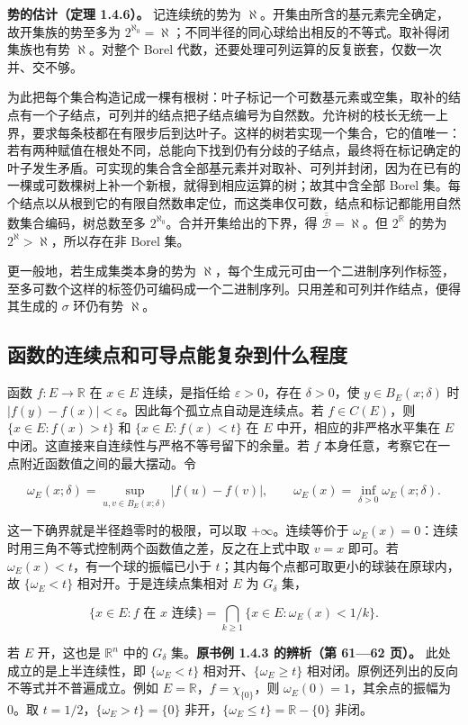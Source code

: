 \documentclass[11pt,a4paper]{article}
\begin{document}
\textbf{势的估计（定理 1.4.6）。} 记连续统的势为 \(\aleph\)。开集由所含的基元素完全确定，故开集族的势至多为 \(2^{\aleph_0}=\aleph\)；不同半径的同心球给出相反的不等式。取补得闭集族也有势 \(\aleph\)。对整个 Borel 代数，还要处理可列运算的反复嵌套，仅数一次并、交不够。

为此把每个集合构造记成一棵有根树：叶子标记一个可数基元素或空集，取补的结点有一个子结点，可列并的结点把子结点编号为自然数。允许树的枝长无统一上界，要求每条枝都在有限步后到达叶子。这样的树若实现一个集合，它的值唯一：若有两种赋值在根处不同，总能向下找到仍有分歧的子结点，最终将在标记确定的叶子发生矛盾。可实现的集合含全部基元素并对取补、可列并封闭，因为在已有的一棵或可数棵树上补一个新根，就得到相应运算的树；故其中含全部 Borel 集。每个结点以从根到它的有限自然数串定位，而这类串仅可数，结点和标记都能用自然数集合编码，树总数至多 \(2^{\aleph_0}\)。合并开集给出的下界，得 \(\overline{\overline{\mathcal B}}=\aleph\)。但 \(2^{\mathbb R}\) 的势为 \(2^{\aleph}>\aleph\)，所以存在非 Borel 集。

更一般地，若生成集类本身的势为 \(\aleph\)，每个生成元可由一个二进制序列作标签，至多可数个这样的标签仍可编码成一个二进制序列。只用差和可列并作结点，便得其生成的 \(\sigma\) 环仍有势 \(\aleph\)。

\subsection{函数的连续点和可导点能复杂到什么程度}

函数 \(f:E\to\mathbb R\) 在 \(x\in E\) 连续，是指任给 \(\varepsilon>0\)，存在 \(\delta>0\)，使 \(y\in B_E(x;\delta)\) 时 \(|f(y)-f(x)|<\varepsilon\)。因此每个孤立点自动是连续点。若 \(f\in C(E)\)，则 \(\{x\in E:f(x)>t\}\) 和 \(\{x\in E:f(x)<t\}\) 在 \(E\) 中开，相应的非严格水平集在 \(E\) 中闭。这直接来自连续性与严格不等号留下的余量。若 \(f\) 本身任意，考察它在一点附近函数值之间的最大摆动。令

\[
\omega_E(x;\delta)=\sup_{u,v\in B_E(x;\delta)}|f(u)-f(v)|,
\qquad \omega_E(x)=\inf_{\delta>0}\omega_E(x;\delta).
\]

这一下确界就是半径趋零时的极限，可以取 \(+\infty\)。连续等价于 \(\omega_E(x)=0\)：连续时用三角不等式控制两个函数值之差，反之在上式中取 \(v=x\) 即可。若 \(\omega_E(x)<t\)，有一个球的振幅已小于 \(t\)；其内每个点都可取更小的球装在原球内，故 \(\{\omega_E<t\}\) 相对开。于是连续点集相对 \(E\) 为 \(G_\delta\) 集，

\[
\{x\in E:f\text{ 在 }x\text{ 连续}\}
=\bigcap_{k\ge1}\{x\in E:\omega_E(x)<1/k\}.
\]

若 \(E\) 开，这也是 \(\mathbb R^n\) 中的 \(G_\delta\) 集。\textbf{原书例 1.4.3 的辨析（第 61---62 页）。} 此处成立的是上半连续性，即 \(\{\omega_E<t\}\) 相对开、\(\{\omega_E\ge t\}\) 相对闭。原例还列出的反向不等式并不普遍成立。例如 \(E=\mathbb R\)，\(f=\chi_{\{0\}}\)，则 \(\omega_E(0)=1\)，其余点的振幅为 \(0\)。取 \(t=1/2\)，\(\{\omega_E>t\}=\{0\}\) 非开，\(\{\omega_E\le t\}=\mathbb R-\{0\}\) 非闭。
\end{document}
